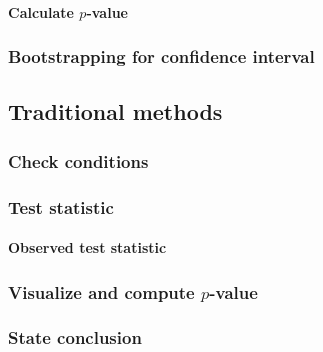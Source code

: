 \documentclass[12pt, krantz2,]{krantz}
\let\oldparagraph\paragraph
\renewcommand{\paragraph}[1]{\oldparagraph{#1}\mbox{}}
\begin{document}
\hypertarget{calculate-p-value-1}{%
\paragraph{\texorpdfstring{Calculate \(p\)-value}{Calculate p-value}}\label{calculate-p-value-1}}

\hypertarget{bootstrapping-for-confidence-interval-1}{%
\subsubsection*{Bootstrapping for confidence interval}\label{bootstrapping-for-confidence-interval-1}}


\hypertarget{traditional-methods-1}{%
\subsection{Traditional methods}\label{traditional-methods-1}}

\hypertarget{check-conditions-1}{%
\subsubsection*{Check conditions}\label{check-conditions-1}}


\hypertarget{test-statistic-1}{%
\subsubsection*{Test statistic}\label{test-statistic-1}}


\hypertarget{observed-test-statistic-1}{%
\paragraph{Observed test statistic}\label{observed-test-statistic-1}}

\hypertarget{visualize-and-compute-p-value}{%
\subsubsection*{\texorpdfstring{Visualize and compute \(p\)-value}{Visualize and compute p-value}}\label{visualize-and-compute-p-value}}


\hypertarget{state-conclusion-1}{%
\subsubsection*{State conclusion}\label{state-conclusion-1}}
\end{document}
